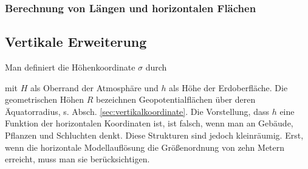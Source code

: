 \documentclass{book}
\begin{document}
\subsubsection{Berechnung von Längen und horizontalen Flächen}
\label{sec:berechung_von_längen_und_horizontalen_flächen}

\subsection{Vertikale Erweiterung}
\label{sec:vertikale_erweiterung}

Man definiert die Höhenkoordinate $\sigma$ durch
%
\begin{center}
\end{center}
%
mit $H$ als Oberrand der Atmosphäre und $h$ als Höhe der Erdoberfläche. Die geometrischen Höhen $R$ bezeichnen Geopotentialflächen über deren Äquatorradius, s. Absch. \ref{sec:vertikalkoordinate}. Die Vorstellung, dass $h$ eine Funktion der horizontalen Koordinaten ist, ist falsch, wenn man an Gebäude, Pflanzen und Schluchten denkt. Diese Strukturen sind jedoch kleinräumig. Erst, wenn die horizontale Modellauflösung die Größenordnung von zehn Metern erreicht, muss man sie berücksichtigen.
\end{document}

